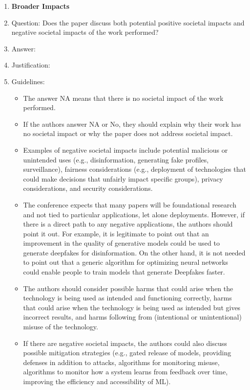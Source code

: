 \documentclass{article}
\begin{document}
\begin{enumerate}
\item {\bf Broader Impacts}
    \item[] Question: Does the paper discuss both potential positive societal impacts and negative societal impacts of the work performed?
    \item[] Answer: \answerTODO{} %
    \item[] Justification: \justificationTODO{}
    \item[] Guidelines:
    \begin{itemize}
        \item The answer NA means that there is no societal impact of the work performed.
        \item If the authors answer NA or No, they should explain why their work has no societal impact or why the paper does not address societal impact.
        \item Examples of negative societal impacts include potential malicious or unintended uses (e.g., disinformation, generating fake profiles, surveillance), fairness considerations (e.g., deployment of technologies that could make decisions that unfairly impact specific groups), privacy considerations, and security considerations.
        \item The conference expects that many papers will be foundational research and not tied to particular applications, let alone deployments. However, if there is a direct path to any negative applications, the authors should point it out. For example, it is legitimate to point out that an improvement in the quality of generative models could be used to generate deepfakes for disinformation. On the other hand, it is not needed to point out that a generic algorithm for optimizing neural networks could enable people to train models that generate Deepfakes faster.
        \item The authors should consider possible harms that could arise when the technology is being used as intended and functioning correctly, harms that could arise when the technology is being used as intended but gives incorrect results, and harms following from (intentional or unintentional) misuse of the technology.
        \item If there are negative societal impacts, the authors could also discuss possible mitigation strategies (e.g., gated release of models, providing defenses in addition to attacks, algorithms for monitoring misuse, algorithms to monitor how a system learns from feedback over time, improving the efficiency and accessibility of ML).
    \end{itemize}
    

\end{enumerate}
\end{document}
